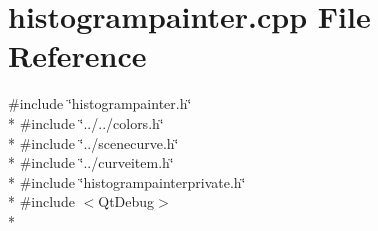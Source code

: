 \section{histogrampainter.\+cpp File Reference}
\label{bk3_2curve_2painters_2histogrampainter_8cpp}
{\ttfamily \#include \char`\"{}histogrampainter.\+h\char`\"{}}\\*
{\ttfamily \#include \char`\"{}../../colors.\+h\char`\"{}}\\*
{\ttfamily \#include \char`\"{}../scenecurve.\+h\char`\"{}}\\*
{\ttfamily \#include \char`\"{}../curveitem.\+h\char`\"{}}\\*
{\ttfamily \#include \char`\"{}histogrampainterprivate.\+h\char`\"{}}\\*
{\ttfamily \#include $<$Qt\+Debug$>$}\\*
